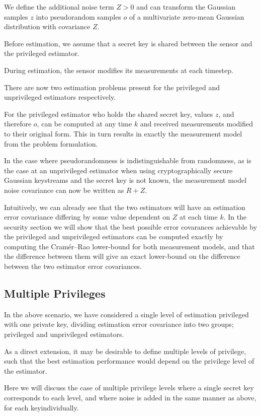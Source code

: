 \documentclass[conference]{IEEEtran}
\theoremstyle{definition}
\theoremstyle{definition}
\theoremstyle{remark}
\begin{document}
We define the additional noise term $Z>0$ and can transform the Gaussian samples $z$ into pseudorandom samples $o$ of a multivariate zero-mean Gaussian distribution with covariance $Z$.

Before estimation, we assume that a secret key is shared between the sensor and the privileged estimator.

During estimation, the sensor modifies its measurements at each timestep.

There are now two estimation problems present for the privileged and unprivileged estimators respectively.

For the privileged estimator who holds the shared secret key, values $z$, and therefore $o$, can be computed at any time $k$ and received measurements modified to their original form. This in turn results in exactly the measurement model from the problem formulation.

In the case where pseudorandomness is indistinguishable from randomness, as is the case at an unprivileged estimator when using cryptographically secure Gaussian keystreams and the secret key is not known, the measurement model noise covariance can now be written as $R+Z$.

Intuitively, we can already see that the two estimators will have an estimation error covariance differing by some value dependent on $Z$ at each time $k$. In the security section we will show that the best possible error covarances achievable by the privileged and unprivileged estimators can be computed exactly by computing the Cramér–Rao lower-bound for both measurement models, and that the difference between them will give an exact lower-bound on the difference between the two estimator error covariances.

\subsection{Multiple Privileges}
In the above scenario, we have considered a single level of estimation privileged with one private key, dividing estimation error covariance into two groups; privileged and unprivileged estimators.

As a direct extension, it may be desirable to define multiple levels of privilege, such that the best estimation performance would depend on the privilege level of the estimator.

Here we will discuss the case of multiple privilege levels where a single secret key corresponds to each level, and where noise is added in the same manner as above, for each keyindividually.
\end{document}
